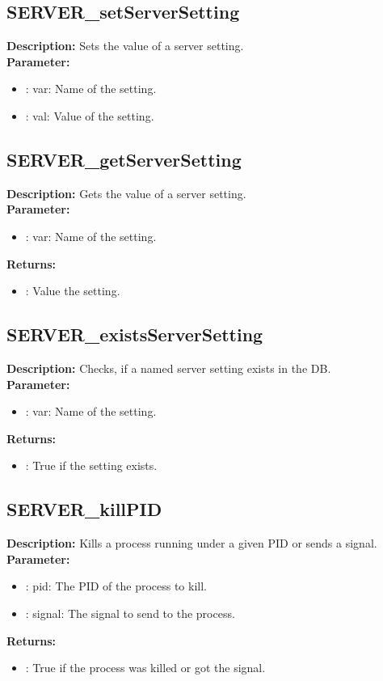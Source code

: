 \subsection{SERVER\_setServerSetting}
\textbf{Description:} Sets the value of a server setting.\\
\textbf{Parameter:}
\begin{itemize}
\item : var: Name of the setting.
\item : val: Value of the setting.
\end{itemize}

\subsection{SERVER\_getServerSetting}
\textbf{Description:} Gets the value of a server setting.\\
\textbf{Parameter:}
\begin{itemize}
\item : var: Name of the setting.
\end{itemize}
\textbf{Returns:}
\begin{itemize}
\item : Value the setting.
\end{itemize}

\subsection{SERVER\_existsServerSetting}
\textbf{Description:} Checks, if a named server setting exists in the DB.\\
\textbf{Parameter:}
\begin{itemize}
\item : var: Name of the setting.
\end{itemize}
\textbf{Returns:}
\begin{itemize}
\item : True if the setting exists.
\end{itemize}

\subsection{SERVER\_killPID}
\textbf{Description:} Kills a process running under a given PID or sends a signal.\\
\textbf{Parameter:}
\begin{itemize}
\item : pid: The PID of the process to kill.
\item : signal: The signal to send to the process.
\end{itemize}
\textbf{Returns:}
\begin{itemize}
\item : True if the process was killed or got the signal.
\end{itemize}

